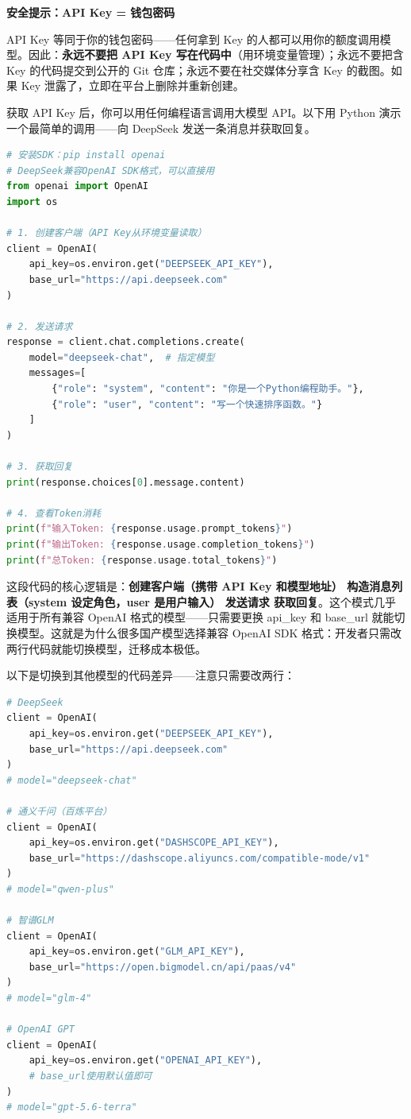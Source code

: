 \textbf{安全提示：API Key = 钱包密码}\par

API Key 等同于你的钱包密码——任何拿到 Key 的人都可以用你的额度调用模型。因此：\textbf{永远不要把 API Key 写在代码中}（用环境变量管理）；永远不要把含 Key 的代码提交到公开的 Git 仓库；永远不要在社交媒体分享含 Key 的截图。如果 Key 泄露了，立即在平台上删除并重新创建。


获取 API Key 后，你可以用任何编程语言调用大模型 API。以下用 Python 演示一个最简单的调用——向 DeepSeek 发送一条消息并获取回复。

\begin{lstlisting}[language=Python]
# 安装SDK：pip install openai
# DeepSeek兼容OpenAI SDK格式，可以直接用
from openai import OpenAI
import os

# 1. 创建客户端（API Key从环境变量读取）
client = OpenAI(
    api_key=os.environ.get("DEEPSEEK_API_KEY"),
    base_url="https://api.deepseek.com"
)

# 2. 发送请求
response = client.chat.completions.create(
    model="deepseek-chat",  # 指定模型
    messages=[
        {"role": "system", "content": "你是一个Python编程助手。"},
        {"role": "user", "content": "写一个快速排序函数。"}
    ]
)

# 3. 获取回复
print(response.choices[0].message.content)

# 4. 查看Token消耗
print(f"输入Token: {response.usage.prompt_tokens}")
print(f"输出Token: {response.usage.completion_tokens}")
print(f"总Token: {response.usage.total_tokens}")
\end{lstlisting}

这段代码的核心逻辑是：\textbf{创建客户端（携带 API Key 和模型地址） 构造消息列表（system 设定角色，user 是用户输入） 发送请求 获取回复}。这个模式几乎适用于所有兼容 OpenAI 格式的模型——只需要更换 api\_key 和 base\_url 就能切换模型。这就是为什么很多国产模型选择兼容 OpenAI SDK 格式：开发者只需改两行代码就能切换模型，迁移成本极低。

以下是切换到其他模型的代码差异——注意只需要改两行：

\begin{lstlisting}[language=Python]
# DeepSeek
client = OpenAI(
    api_key=os.environ.get("DEEPSEEK_API_KEY"),
    base_url="https://api.deepseek.com"
)
# model="deepseek-chat"

# 通义千问（百炼平台）
client = OpenAI(
    api_key=os.environ.get("DASHSCOPE_API_KEY"),
    base_url="https://dashscope.aliyuncs.com/compatible-mode/v1"
)
# model="qwen-plus"

# 智谱GLM
client = OpenAI(
    api_key=os.environ.get("GLM_API_KEY"),
    base_url="https://open.bigmodel.cn/api/paas/v4"
)
# model="glm-4"

# OpenAI GPT
client = OpenAI(
    api_key=os.environ.get("OPENAI_API_KEY"),
    # base_url使用默认值即可
)
# model="gpt-5.6-terra"
\end{lstlisting}

